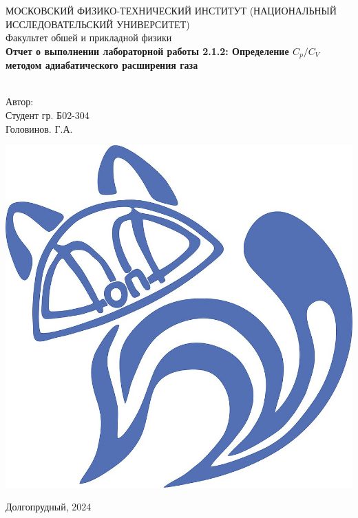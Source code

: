 \begin{titlepage}
	\begin{center}
		МОСКОВСКИЙ ФИЗИКО-ТЕХНИЧЕСКИЙ ИНСТИТУТ (НАЦИОНАЛЬНЫЙ ИССЛЕДОВАТЕЛЬСКИЙ УНИВЕРСИТЕТ) \\
		
		
		\hfill \break
		Факультет обшей и прикладной физики\\
		\vspace{2.5cm}
		\large{\textbf{Отчет о выполнении лабораторной работы 2.1.2: Определение $C_p/C_V$ методом адиабатического расширения газа}}\\
		\hfill \break
		\\
	\end{center}
	
	\begin{flushright}
		Автор:\\
		Студент гр. Б02-304\\
		Головинов. Г.А.
	\end{flushright}
	
	\vfill
	
	\begin{center}
		\includegraphics[width=0.15\linewidth]{uni}
	\end{center}
	
	
	
	
	\begin{center} Долгопрудный, 2024 \end{center}
	
	\thispagestyle{empty}
	
\end{titlepage}